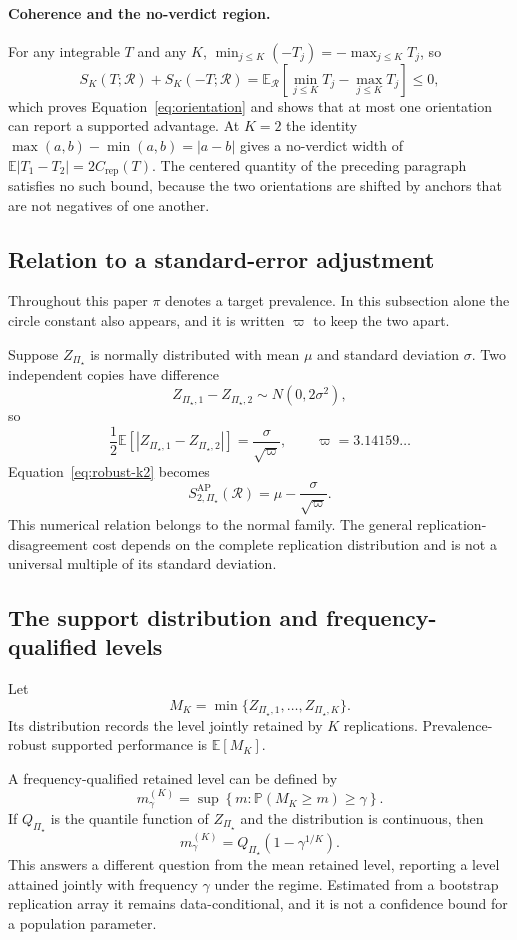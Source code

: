 \documentclass[11pt]{article}
\newcommand{\Regime}{\mathcal{R}}
\newcommand{\PSet}{\Pi_\star}
\newcommand{\E}{\mathbb{E}}
\newcommand{\Prb}{\mathbb{P}}
\theoremstyle{remark}
\begin{document}
\paragraph{Coherence and the no-verdict region.}
For any integrable $T$ and any $K$, $\min_{j\leq K}(-T_j)=-\max_{j\leq K}T_j$, so
\[
S_K(T;\Regime)+S_K(-T;\Regime)
=
\E_{\Regime}
\left[
\min_{j\leq K}T_j-\max_{j\leq K}T_j
\right]
\leq0,
\]
which proves Equation~\eqref{eq:orientation} and shows that at most one orientation can report a supported advantage. At $K=2$ the identity $\max(a,b)-\min(a,b)=|a-b|$ gives a no-verdict width of $\E|T_1-T_2|=2C_{\mathrm{rep}}(T)$. The centered quantity of the preceding paragraph satisfies no such bound, because the two orientations are shifted by anchors that are not negatives of one another.

\subsection{Relation to a standard-error adjustment}

Throughout this paper $\pi$ denotes a target prevalence. In this subsection alone the circle constant also appears, and it is written $\varpi$ to keep the two apart.

Suppose $Z_{\PSet}$ is normally distributed with mean $\mu$ and standard deviation $\sigma$. Two independent copies have difference
\[
Z_{\PSet,1}-Z_{\PSet,2}
\sim
N(0,2\sigma^2),
\]
so
\[
\frac12
\E
\left[
|Z_{\PSet,1}-Z_{\PSet,2}|
\right]
=
\frac{\sigma}{\sqrt{\varpi}},
\qquad
\varpi=3.14159\ldots
\]
Equation~\eqref{eq:robust-k2} becomes
\[
S_{2,\PSet}^{\mathrm{AP}}(\Regime)
=
\mu-\frac{\sigma}{\sqrt{\varpi}}.
\]
This numerical relation belongs to the normal family. The general replication-disagreement cost depends on the complete replication distribution and is not a universal multiple of its standard deviation.

\subsection{The support distribution and frequency-qualified levels}

Let
\[
M_K
=
\min\{Z_{\PSet,1},\ldots,Z_{\PSet,K}\}.
\]
Its distribution records the level jointly retained by $K$ replications. Prevalence-robust supported performance is $\E[M_K]$.

A frequency-qualified retained level can be defined by
\[
m_\gamma^{(K)}
=
\sup
\left\{
m:
\Prb(M_K\geq m)\geq\gamma
\right\}.
\]
If $Q_{\PSet}$ is the quantile function of $Z_{\PSet}$ and the distribution is continuous, then
\begin{equation}
m_\gamma^{(K)}
=
Q_{\PSet}\left(1-\gamma^{1/K}\right).
\label{eq:frequency-level}
\end{equation}
This answers a different question from the mean retained level, reporting a level attained jointly with frequency $\gamma$ under the regime. Estimated from a bootstrap replication array it remains data-conditional, and it is not a confidence bound for a population parameter.
\end{document}

